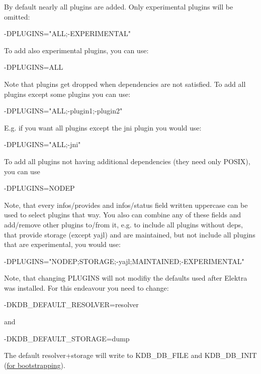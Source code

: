 By default nearly all plugins are added. Only experimental plugins will be omitted\+: \begin{DoxyVerb}    -DPLUGINS="ALL;-EXPERIMENTAL"
\end{DoxyVerb}


To add also experimental plugins, you can use\+: \begin{DoxyVerb}    -DPLUGINS=ALL
\end{DoxyVerb}


Note that plugins get dropped when dependencies are not satisfied. To add all plugins except some plugins you can use\+: \begin{DoxyVerb}    -DPLUGINS="ALL;-plugin1;-plugin2"
\end{DoxyVerb}


E.\+g. if you want all plugins except the jni plugin you would use\+: \begin{DoxyVerb}    -DPLUGINS="ALL;-jni"
\end{DoxyVerb}


To add all plugins not having additional dependencies (they need only P\+O\+S\+I\+X), you can use \begin{DoxyVerb}    -DPLUGINS=NODEP
\end{DoxyVerb}


Note, that every {\ttfamily infos/provides} and {\ttfamily infos/status} field written uppercase can be used to select plugins that way. You also can combine any of these fields and add/remove other plugins to/from it, e.\+g. to include all plugins without deps, that provide storage (except yajl) and are maintained, but not include all plugins that are experimental, you would use\+: \begin{DoxyVerb}    -DPLUGINS="NODEP;STORAGE;-yajl;MAINTAINED;-EXPERIMENTAL"
\end{DoxyVerb}


Note, that changing {\ttfamily P\+L\+U\+G\+I\+N\+S} will not modifiy the defaults used after Elektra was installed. For this endeavour you need to change\+: \begin{DoxyVerb}    -DKDB_DEFAULT_RESOLVER=resolver
\end{DoxyVerb}


and \begin{DoxyVerb}    -DKDB_DEFAULT_STORAGE=dump
\end{DoxyVerb}


The default resolver+storage will write to {\ttfamily K\+D\+B\+\_\+\+D\+B\+\_\+\+F\+I\+L\+E} and {\ttfamily K\+D\+B\+\_\+\+D\+B\+\_\+\+I\+N\+I\+T} (\hyperlink{md_doc_help_elektra-bootstrapping_doc_help_elektra-bootstrapping_md}{for bootstrapping}).

